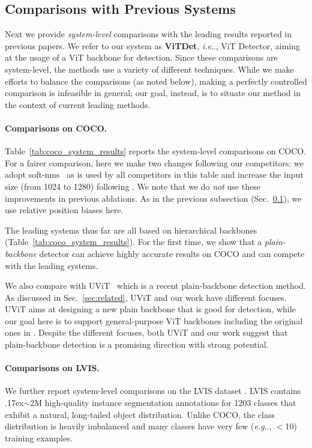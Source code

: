 \documentclass[runningheads]{llncs}
\makeatletter
\newcommand{\app}{\raise.17ex\hbox{$\scriptstyle\sim$}}
\DeclareRobustCommand\onedot{\futurelet\@let@token\@onedot}
\def\@onedot{\ifx\@let@token.\else.\null\fi\xspace}
\def\eg{\emph{e.g}\onedot} \def\Eg{\emph{E.g}\onedot}
\def\ie{\emph{i.e}\onedot} \def\Ie{\emph{I.e}\onedot}
\makeatother
\begin{document}
\subsection{Comparisons with Previous Systems} \label{subsec:vs_prev}

Next we provide \textit{system-level} comparisons with the leading results reported in previous papers. We refer to our system as \textbf{ViTDet}, \ie, ViT Detector, aiming at the usage of a ViT backbone for detection. Since these comparisons are system-level, the methods use a variety of different techniques. While we make efforts to balance the comparisons (as noted below), making a perfectly controlled comparison is infeasible in general; our goal, instead, is to situate our method in the context of current leading methods.

\paragraph{Comparisons on COCO.} Table~\ref{tab:coco_system_results} reports the system-level comparisons on COCO.
For a fairer comparison, here we make two changes following our competitors: we adopt soft-nms~\cite{Bodla2017} as is used by all competitors \cite{Liu2021,Li2021a,Liang2021,Liu2021a} in this table and increase the input size (from 1024 to 1280) following \cite{Liang2021,Liu2021a}. We note that we do \textit{not} use these improvements in previous ablations. As in the previous subsection (Sec.~\ref{subsec:vs_prev}), we use relative position biases here.

The leading systems thus far are all based on hierarchical backbones (Table~\ref{tab:coco_system_results}). For the first time, we show that a \textit{plain-backbone} detector can achieve highly accurate results on COCO and can compete with the leading systems.

We also compare with UViT~\cite{Chen2021b} which is a recent plain-backbone detection method. As discussed in Sec.~\ref{sec:related}, UViT and our work have different focuses. UViT aims at designing a new plain backbone that is good for detection, while our goal here is to support general-purpose ViT backbones including the original ones in \cite{Dosovitskiy2021}.
Despite the different focuses, both UViT and our work suggest that plain-backbone detection is a promising direction with strong potential.

\paragraph{Comparisons on LVIS.} We further report system-level comparisons on the LVIS dataset \cite{Gupta2019}. LVIS contains \app2M high-quality instance segmentation annotations for 1203 classes that exhibit a natural, long-tailed object distribution. Unlike COCO, the class distribution is heavily imbalanced and many classes have very few (\eg, $<$10) training examples.
\end{document}
